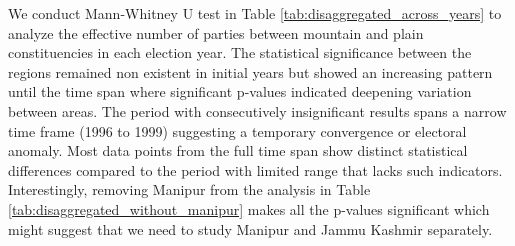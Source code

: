     \begin{table}[htbp]
    \centering
    \caption{Year-wise Comparison Between Mountain and Plain Constituencies without Manipur}
    \label{tab:disaggregated_without_manipur}
    \end{table}
    
    We conduct Mann-Whitney U test  in Table \ref{tab:disaggregated_across_years} to analyze the effective number of parties between mountain and plain constituencies in each election year. The statistical significance between the regions remained non existent in initial years but showed an increasing pattern until the time span where significant p-values indicated deepening variation between areas. The  period with consecutively insignificant results spans a narrow time frame (1996 to 1999) suggesting a temporary convergence or electoral anomaly.  Most data points from the full time span show distinct statistical differences compared to the period with limited range that lacks such indicators. Interestingly, removing Manipur from the analysis in Table \ref{tab:disaggregated_without_manipur} makes all the p-values significant which might suggest that we need to study Manipur and Jammu Kashmir separately. 
    
